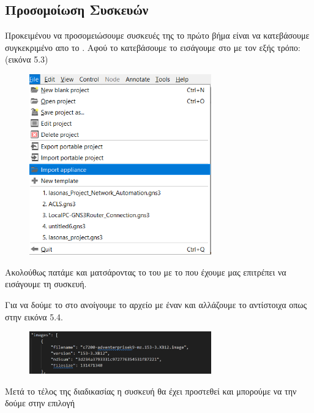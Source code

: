 \subsection{Προσομοίωση Συσκευών }

Προκειμένου να προσομειώσουμε συσκευές της  το πρώτο βήμα είναι να κατεβάσουμε συγκεκριμένο  απο το .
Αφού το κατεβάσουμε το εισάγουμε στο  με τον εξής τρόπο: (εικόνα 5.3)

\FloatBarrier

\begin{figure}[htb]
	\centering
	\includegraphics[width=0.7\textwidth]{graphics/import_appliance.png}
	\caption{ }
\end{figure}

Ακολούθως πατάμε  και ματσάροντας το  του  με το  που έχουμε μας επιτρέπει να εισάγουμε τη συσκευή.

Για να δούμε το  στο  ανοίγουμε το αρχείο με έναν  και αλλάζουμε το  αντίστοιχα οπως στην  εικόνα 5.4.

\FloatBarrier

\begin{figure}[htb]
	\centering
	\includegraphics[width=0.7\textwidth]{graphics/appliance_filename.png}
	\caption{ }
\end{figure}

\FloatBarrier

Μετά το τέλος της διαδικασίας η συσκευή θα έχει προστεθεί και μπορούμε να την δούμε στην επιλογή 

